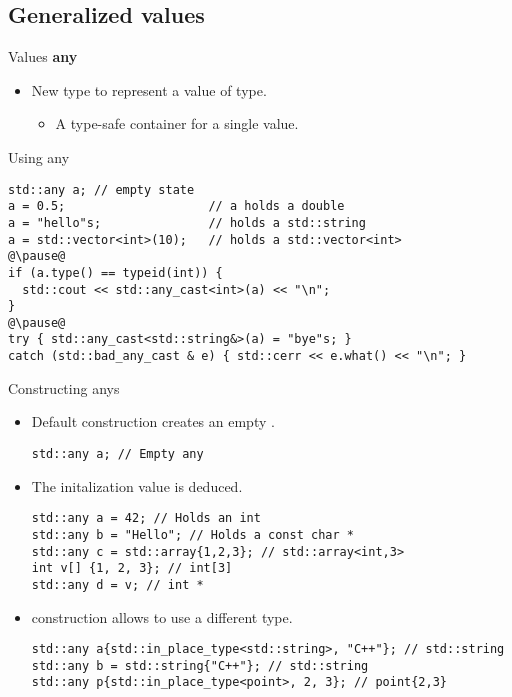 \subsection{Generalized values}

\begin{frame}[t,fragile]{Values \textbf{any}}
\begin{itemize}
  \item New  type to represent a value of  type.
    \begin{itemize}
      \item A type-safe container for a single value.
    \end{itemize}
\end{itemize}
\begin{block}{Using any}
\begin{lstlisting}[escapechar=@]
std::any a; // empty state
a = 0.5;                    // a holds a double
a = "hello"s;               // holds a std::string
a = std::vector<int>(10);   // holds a std::vector<int> 
@\pause@
if (a.type() == typeid(int)) {
  std::cout << std::any_cast<int>(a) << "\n";
}
@\pause@
try { std::any_cast<std::string&>(a) = "bye"s; }
catch (std::bad_any_cast & e) { std::cerr << e.what() << "\n"; }
\end{lstlisting}
\end{block}
\end{frame}

\begin{frame}[t,fragile]{Constructing anys}
\begin{itemize}
  \item Default construction creates an empty .
\begin{lstlisting}
std::any a; // Empty any
\end{lstlisting}

  \item The initalization value is deduced.
\begin{lstlisting}
std::any a = 42; // Holds an int
std::any b = "Hello"; // Holds a const char *
std::any c = std::array{1,2,3}; // std::array<int,3>
int v[] {1, 2, 3}; // int[3]
std::any d = v; // int *
\end{lstlisting}

  \item {} construction allows to use a different type.
\begin{lstlisting}
std::any a{std::in_place_type<std::string>, "C++"}; // std::string
std::any b = std::string{"C++"}; // std::string
std::any p{std::in_place_type<point>, 2, 3}; // point{2,3}
\end{lstlisting}

\end{itemize}
\end{frame}

